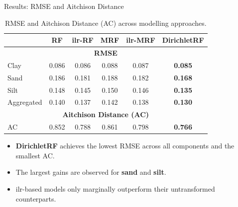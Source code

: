 \begin{frame}{Results: RMSE and Aitchison Distance}

\begin{table}
\centering
\small
\caption{RMSE and Aitchison Distance (AC) across modelling approaches.}
\begin{tabular}{lccccc}
\toprule
 & RF & ilr-RF & MRF & ilr-MRF & \textbf{DirichletRF} \\
\midrule
\multicolumn{6}{c}{\textbf{RMSE}} \\
\midrule
Clay        & 0.086 & 0.086 & 0.088 & 0.087 & \textbf{0.085} \\
Sand        & 0.186 & 0.181 & 0.188 & 0.182 & \textbf{0.168} \\
Silt        & 0.148 & 0.145 & 0.150 & 0.146 & \textbf{0.135} \\
Aggregated  & 0.140 & 0.137 & 0.142 & 0.138 & \textbf{0.130} \\
\midrule
\multicolumn{6}{c}{\textbf{Aitchison Distance (AC)}} \\
\midrule
AC & 0.852 & 0.788 & 0.861 & 0.798 & \textbf{0.766} \\
\bottomrule
\end{tabular}
\end{table}

\begin{itemize}
    \item \textbf{DirichletRF} achieves the lowest RMSE across all components and the smallest AC.
    \item The largest gains are observed for \textbf{sand} and \textbf{silt}.
    \item ilr-based models only marginally outperform their untransformed counterparts.
\end{itemize}

\end{frame}


